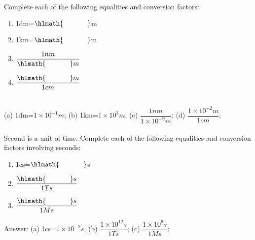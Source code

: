 \documentclass[main.tex]{subfiles}
\begin{document}











\begin{example} %
Complete each of the following equalities and conversion factors:

\begin{multicols}{2}
\begin{enumerate}[label=(\alph*)]
\item 1dm=$\hlmath{\hspace{35pt }}$m
\item 1km=$\hlmath{\hspace{35pt }}$m
\item  $\dfrac{1nm}{\hlmath{\hspace{35pt }}m}$
\item  $\dfrac{\hlmath{\hspace{35pt }}m}{1cm}$

\end{enumerate}
\end{multicols}
\\
(a) 1dm=$1\times10^{-1}m$; (b) 1km=$1\times10^{3}m$; (c) $\dfrac{1nm}{1\times10^{-9}m}$; (d) $\dfrac{1\times10^{-2}m}{1cm}$; 
\\
\faDiamond\ \\
Second is a unit of time. Complete each of the following equalities and conversion factors involving seconds:
\begin{multicols}{3}
\begin{enumerate}[label=(\alph*)]
\item 1cs=$\hlmath{\hspace{35pt }}$s
\item $\dfrac{\hlmath{\hspace{35pt }}s}{1Ts}$
\item $\dfrac{\hlmath{\hspace{35pt }}s}{1Ms}$
\end{enumerate}
\end{multicols}
\flushright Answer: (a) 1cs=$1\times10^{-2}s$; (b) $\dfrac{ 1\times10^{12} s}{1Ts}$; (c) $\dfrac{ 1\times10^{6} s}{1Ms}$;
\end{example}%
\end{document}
